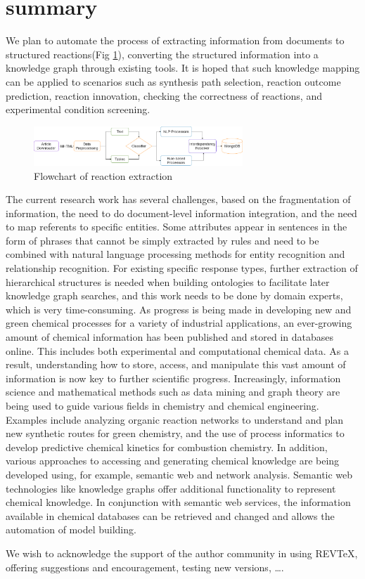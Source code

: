 \documentclass[%
 aip,
 jmp,%
 amsmath,amssymb,
 reprint,%
]{revtex4-2}
\begin{document}
\section{summary}
We plan to automate the process of extracting information from documents to structured reactions(Fig \ref{ Fig.7 }), 
converting the structured information into a knowledge graph through existing tools. It is hoped that such knowledge 
mapping can be applied to scenarios such as synthesis path
selection, reaction outcome prediction, reaction innovation, checking the correctness of reactions, and experimental condition screening.
\begin{figure}[htbp]
 \centering
 \includegraphics[width=0.7\textwidth]{figure/7.png}
 \caption{ Flowchart of reaction extraction }
 \label{ Fig.7 }
\end{figure}
The current research work has several challenges, based on the fragmentation of information, the need to do document-level information 
integration, and the need to map referents to specific entities. Some attributes appear in sentences in the form of phrases that cannot 
be simply extracted by rules and need to be combined with natural language processing methods for entity recognition and relationship 
recognition. For existing specific response types, further extraction of hierarchical structures is needed when building ontologies to 
facilitate later knowledge graph searches, and this work needs to be done by domain experts, which is very time-consuming.
As progress is being made in developing new and green chemical processes for a variety of
industrial applications, an ever-growing amount of chemical information has been 
published and stored in databases online. This includes both experimental and 
computational chemical data. As a result, understanding how to store, access, 
and manipulate this vast amount of information is now key to further scientific 
progress. Increasingly, information science and mathematical methods such as data 
mining and graph theory are being used to guide various fields in chemistry and chemical 
engineering. Examples include analyzing organic reaction networks to understand and 
plan new synthetic routes for green chemistry, and the use of process 
informatics to develop predictive chemical kinetics for combustion chemistry. 
In addition, various approaches to accessing and generating chemical knowledge are
being developed using, for example, semantic web and network analysis.
Semantic web technologies like knowledge graphs offer additional functionality to
represent chemical knowledge. In conjunction with semantic web services, the information 
available in chemical databases can be retrieved and changed and 
allows the automation of model building.

\begin{acknowledgments}
We wish to acknowledge the support of the author community in using
REV\TeX{}, offering suggestions and encouragement, testing new versions,
\dots.
\end{acknowledgments}

\nocite{*}
\end{document}
